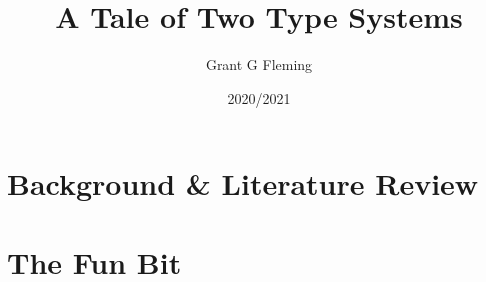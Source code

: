 \documentclass{FinalYearReport}[2020/09/15]
\title{A Tale of Two Type Systems}
\author{Grant G Fleming}
\date{2020/2021}
\begin{document}
	\maketitle
	\tableofcontents
        
        
        \part{Background \& Literature Review}
	
          
	
	
	
        \part{The Fun Bit}
	
	
	
	
	\clearpage
	\printbibliography
	\nocite{*} %
\end{document}
